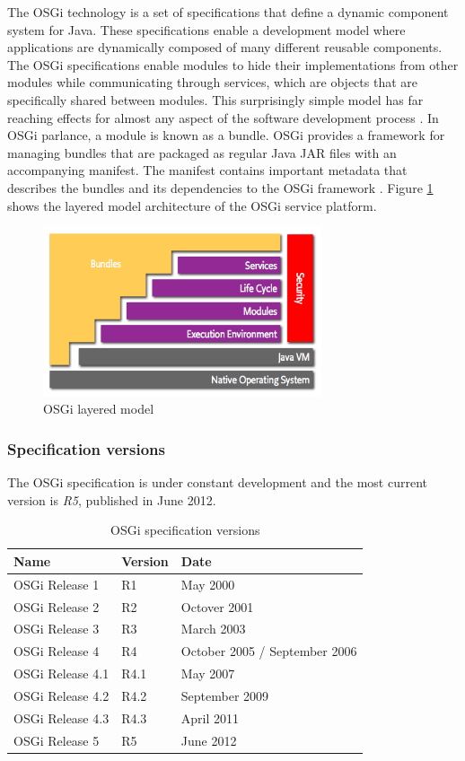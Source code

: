 The \gls{OSGi} technology is a set of specifications that define a dynamic component system for Java. These specifications enable a development model where applications are dynamically composed of many different reusable components. The \gls{OSGi} specifications enable modules to hide their implementations from other modules while communicating through services, which are objects that are specifically shared between modules. This surprisingly simple model has far reaching effects for almost any aspect of the software development process \cite{OSGi}. In \gls{OSGi} parlance, a module is known as a bundle. \gls{OSGi} provides a framework for managing bundles that are packaged as regular Java JAR files with an accompanying manifest. The manifest contains important metadata that describes the bundles and its dependencies to the \gls{OSGi} framework \cite{Knoernschild:2012}. Figure \ref{fig:layering-osgi} shows the layered model architecture of the \gls{OSGi} service platform.

\begin{figure}[H]
\centering
\includegraphics[width=0.73\textwidth]{layering-osgi.png}
\caption{\gls{OSGi} layered model \cite{OSGi}}
\label{fig:layering-osgi}
\end{figure}

\newpage
\subsubsection{Specification versions}
The \gls{OSGi} specification is under constant development and the most current version is \textit{R5}, published in June 2012.

\begin{table}[H]
\centering
\begin{tabular*}{\textwidth}{ l l l }
	\toprule
	Name & Version & Date \\
	\midrule
	OSGi Release 1 & R1 & May 2000 \\
	OSGi Release 2 & R2 & Octover 2001 \\
	OSGi Release 3 & R3 & March 2003 \\
	OSGi Release 4 & R4 & October 2005 / September 2006 \\
	OSGi Release 4.1 & R4.1 & May 2007 \\
	OSGi Release 4.2 & R4.2 & September 2009 \\
	OSGi Release 4.3 & R4.3 & April 2011 \\
	OSGi Release 5 & R5 & June 2012 \\
	\bottomrule
\end{tabular*}
\caption{OSGi specification versions}
\label{tbl:osgi-versions}
\end{table}

